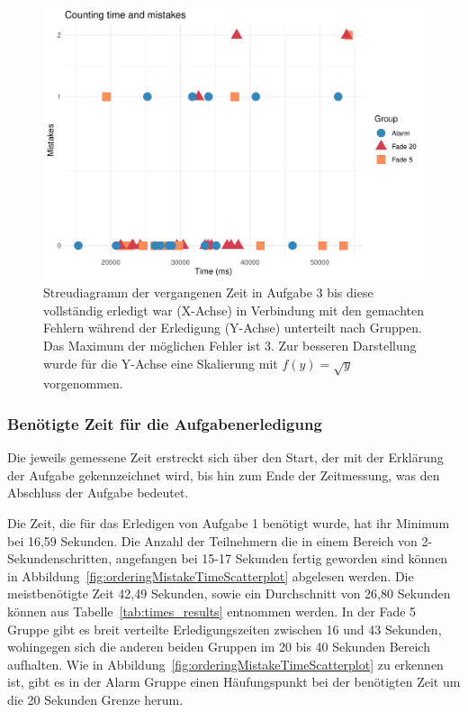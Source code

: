 \begin{figure}[H]
	\centering
	\includegraphics[width=\textwidth]{./_StudyResults/countingMisTimeScat}
	\caption{Streudiagramm der vergangenen Zeit in Aufgabe 3 bis diese vollständig erledigt war (X-Achse) in Verbindung mit den gemachten Fehlern während der Erledigung (Y-Achse) unterteilt nach Gruppen. Das Maximum der möglichen Fehler ist 3. Zur besseren Darstellung wurde für die Y-Achse eine Skalierung mit $f(y) = \sqrt{y}$ vorgenommen.}
	\label{fig:countingMistakeTimeScatterplot}
\end{figure}

\subsubsection{Benötigte Zeit für die Aufgabenerledigung}

Die jeweils gemessene Zeit erstreckt sich über den Start, der mit der Erklärung der Aufgabe gekennzeichnet wird, bis hin zum Ende der Zeitmessung, was den Abschluss der Aufgabe bedeutet.

Die Zeit, die für das Erledigen von Aufgabe 1 benötigt wurde, hat ihr Minimum bei 16,59 Sekunden. Die Anzahl der Teilnehmern die in einem Bereich von 2-Sekundenschritten, angefangen bei 15-17 Sekunden fertig geworden sind können in Abbildung~\ref{fig:orderingMistakeTimeScatterplot} abgelesen werden. Die meistbenötigte Zeit 42,49 Sekunden, sowie ein Durchschnitt von 26,80 Sekunden können aus Tabelle~\ref{tab:times_results} entnommen werden.
In der Fade 5 Gruppe gibt es breit verteilte Erledigungszeiten zwischen 16 und 43 Sekunden, wohingegen sich die anderen beiden Gruppen im 20 bis 40 Sekunden Bereich aufhalten. Wie in Abbildung~\ref{fig:orderingMistakeTimeScatterplot} zu erkennen ist, gibt es in der Alarm Gruppe einen Häufungspunkt bei der benötigten Zeit um die 20 Sekunden Grenze herum.

